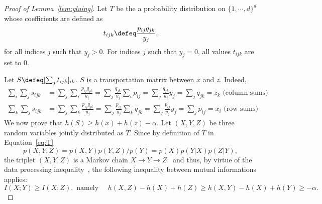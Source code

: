 \documentclass{amsart} %
\begin{document}
\begin{proof}[Proof of Lemma~\ref{lem:gluing}]
	Let $T$ be the a probability distribution on $\{1,\cdots,d\}^d$ whose coefficients are defined as 
\begin{equation}\label{eq:T}t_{ijk}\defeq \frac{p_{ij}q_{jk}}{y_j},\end{equation}
	for all indices $j$ such that $y_j>0$. For indices $j$ such that $y_j=0$, all values $t_{ijk}$ are set to $0$.

Let	$S \defeq [ \sum_{j} t_{ijk}]_{ik}$. $S$ is a transportation matrix between $x$ and $z$. Indeed, 
	$$\begin{aligned}
	\sum_{i} \sum_{j} s_{ijk}&= \sum_{j} \sum_{i}\frac{p_{ij}q_{jk}}{y_j}= \sum_{j} \frac{q_{jk}}{y_j} \sum_{i} p_{ij} =\sum_{j} \frac{q_{jk}}{y_j} y_j=\sum_j q_{jk}=z_k \text{  (column sums) }\\
	\sum_{k} \sum_{j} s_{ijk}&= \sum_{j} \sum_{k}\frac{p_{ij}q_{jk}}{y_j}= \sum_{j} \frac{p_{ij}}{y_j} \sum_{k}q_{jk} =\sum_{j} \frac{p_{ij}}{y_j} y_j=\sum_j p_{ij}=x_i \text{  (row sums) }
	\end{aligned}
	$$
	We now prove that $h(S)\geq h(x)+h(z)-\alpha$. Let $(X,Y,Z)$ be three random variables jointly distributed as $T$. Since by definition of $T$ in Equation~\eqref{eq:T}
	$$p(X,Y,Z)=p(X,Y)p(Y,Z)/p(Y)= p(X)p(Y|X)p(Z|Y),$$ the triplet $(X,Y,Z)$ is a Markov chain $X\rightarrow Y \rightarrow Z$~\citep[Equation 2.118]{cover91elements} and thus, by virtue of the data processing inequality~\citep[Theorem 2.8.1]{cover91elements}, the following inequality between mutual informations applies:
$$\label{eq:dpi}I(X;Y)\geq I(X;Z),\text{ namely } \quad h(X,Z)-h(X)+h(Z)\geq h(X,Y) -h(X)+h(Y)\geq -\alpha.$$\end{proof}
\end{document}
